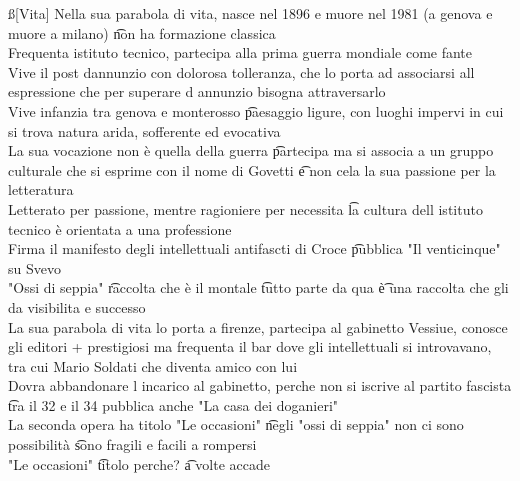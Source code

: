 \documentclass[12pt]{article}
\begin{document}
\ss[Vita]
Nella sua parabola di vita, nasce nel 1896 e muore nel 1981 (a genova e muore a milano) \t non ha formazione classica \\
Frequenta istituto tecnico, partecipa alla prima guerra mondiale come fante \\
Vive il post dannunzio con dolorosa tolleranza, che lo porta ad associarsi all espressione che per superare d annunzio bisogna attraversarlo \\
Vive infanzia tra genova e monterosso \t paesaggio ligure, con luoghi impervi in cui si trova natura arida, sofferente ed evocativa \\
La sua vocazione non è quella della guerra \t partecipa ma si associa a un gruppo culturale che si esprime con il nome di Govetti \t e non cela la sua passione per la letteratura \\
Letterato per passione, mentre ragioniere per necessita \t la cultura dell istituto tecnico è orientata a una professione \\
Firma il manifesto degli intellettuali antifascti di Croce \t pubblica "Il venticinque" su Svevo \\
"Ossi di seppia" \t raccolta che è il montale \t tutto parte da qua \t è una raccolta che gli da visibilita e successo \\
La sua parabola di vita lo porta a firenze, partecipa al gabinetto Vessiue, conosce gli editori + prestigiosi ma frequenta il bar dove gli intellettuali si introvavano, tra cui Mario Soldati che diventa amico con lui \\
Dovra abbandonare l incarico al gabinetto, perche non si iscrive al partito fascista \t tra il 32 e il 34 pubblica anche "La casa dei doganieri" \\
La seconda opera ha titolo "Le occasioni" \t negli "ossi di seppia" non ci sono possibilità \t sono fragili e facili a rompersi \\
"Le occasioni" \t titolo perche? \t a volte accade
\end{document}
